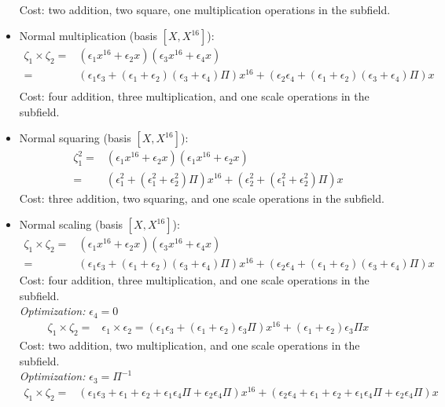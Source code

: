 \begin{itemize}
\begin{align*}
	\end{align*}
	Cost: two addition, two square, one multiplication operations in the subfield.
	\item Normal multiplication (basis $[X, X^{16}]$):
	\begin{align*}
	\zeta_1 \times \zeta_2 = & (\epsilon_1 x^{16} + \epsilon_2 x)(\epsilon_3 x^{16} + \epsilon_4 x) \\
	= & (\epsilon_1\epsilon_3 + (\epsilon_1 + \epsilon_2)(\epsilon_3 + \epsilon_4)\Pi) x^{16} + (\epsilon_2\epsilon_4 + (\epsilon_1 + \epsilon_2)(\epsilon_3 + \epsilon_4)\Pi) x \\
	\end{align*}
	Cost: four addition, three multiplication, and one scale operations in the subfield.
	\item Normal squaring (basis $[X, X^{16}]$):
	\begin{align*}
	\zeta_1^2 = & (\epsilon_1 x^{16} + \epsilon_2 x)(\epsilon_1 x^{16} + \epsilon_2 x) \\
	= & (\epsilon_1^2 + (\epsilon_1^2 + \epsilon_2^2)\Pi) x^{16} + (\epsilon_2^2 + (\epsilon_1^2 + \epsilon_2^2)\Pi) x
	\end{align*}
	Cost: three addition, two squaring, and one scale operations in the subfield.
	\item Normal scaling (basis $[X, X^{16}]$):
	\begin{align*}
	\zeta_1 \times \zeta_2 = & (\epsilon_1 x^{16} + \epsilon_2 x)(\epsilon_3 x^{16} + \epsilon_4 x) \\
	= & (\epsilon_1\epsilon_3 + (\epsilon_1 + \epsilon_2)(\epsilon_3 + \epsilon_4)\Pi) x^{16} + (\epsilon_2\epsilon_4 + (\epsilon_1 + \epsilon_2)(\epsilon_3 + \epsilon_4)\Pi) x 
	\end{align*}
	Cost: four addition, three multiplication, and one scale operations in the subfield.\\
	\emph{Optimization:} $\epsilon_4 = 0$
	\begin{align*}
	\zeta_1 \times \zeta_2 = & \epsilon_1 \times \epsilon_2 = (\epsilon_1\epsilon_3 + (\epsilon_1 + \epsilon_2)\epsilon_3\Pi) x^{16} + (\epsilon_1 + \epsilon_2)\epsilon_3\Pi x
	\end{align*}
	Cost: two addition, two multiplication, and one scale operations in the subfield. \\
	\emph{Optimization:} $\epsilon_3 = \Pi^{-1}$
	\begin{align*}
	\zeta_1 \times \zeta_2 = & (\epsilon_1\epsilon_3 + \epsilon_1 + \epsilon_2 + \epsilon_1\epsilon_4\Pi + \epsilon_2\epsilon_4\Pi) x^{16} + (\epsilon_2\epsilon_4 + \epsilon_1 + \epsilon_2 + \epsilon_1\epsilon_4\Pi + \epsilon_2\epsilon_4\Pi) x \\

\end{align*}
\end{itemize}

